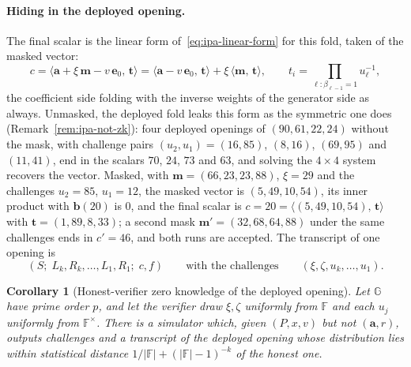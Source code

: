 \documentclass[11pt,a4paper]{article}
\newtheorem{corollary}[theorem]{Corollary}
\theoremstyle{definition}
\newcommand{\F}{\mathbb{F}}
\newcommand{\G}{\mathbb{G}}
\newcommand{\ip}[2]{\langle #1,\, #2 \rangle}
\begin{document}
\paragraph{Hiding in the deployed opening.}
The final scalar is the linear form of~\eqref{eq:ipa-linear-form} for
this fold, taken of the masked vector:
\begin{equation}\label{eq:ipa-masked-scalar}
c = \ip{\mathbf a + \xi\,\mathbf m - v\,\mathbf e_0}{\mathbf t}
  = \ip{\mathbf a - v\,\mathbf e_0}{\mathbf t} + \xi\,\ip{\mathbf m}{\mathbf t},
\qquad
t_i = \prod_{\ell : \beta_{\ell-1} = 1} u_\ell^{-1},
\end{equation}
the coefficient side folding with the inverse weights of the generator
side as always. Unmasked, the deployed fold leaks this form as the
symmetric one does (Remark~\ref{rem:ipa-not-zk}):
four deployed openings of $(90, 61, 22, 24)$ without the mask, with
challenge pairs $(u_2, u_1) = (16, 85)$, $(8, 16)$, $(69, 95)$ and
$(11, 41)$, end in the scalars $70$, $24$, $73$ and $63$, and solving
the $4 \times 4$ system recovers the vector.
Masked, with $\mathbf m = (66, 23, 23, 88)$, $\xi = 29$ and the
challenges $u_2 = 85$, $u_1 = 12$, the masked vector is
$(5, 49, 10, 54)$, its inner product with $\mathbf b(20)$ is $0$, and
the final scalar is $c = 20 = \ip{(5, 49, 10, 54)}{\mathbf t}$ with
$\mathbf t = (1, 89, 8, 33)$; a second mask
$\mathbf m' = (32, 68, 64, 88)$ under the same challenges ends in
$c' = 46$, and both runs are accepted. The transcript of one opening
is
\[
(S;\; L_k, R_k, \dots, L_1, R_1;\; c, f)
\qquad\text{with the challenges}\qquad
(\xi, \zeta, u_k, \dots, u_1).
\]

\begin{corollary}[Honest-verifier zero knowledge of the deployed
  opening]\label{cor:ipa-hvzk-dep}
Let $\G$ have prime order $p$, and let the verifier draw $\xi, \zeta$
uniformly from $\F$ and each $u_j$ uniformly from $\F^{\times}$. There
is a simulator which, given $(P, x, v)$ but not $(\mathbf a, r)$,
outputs challenges and a transcript of the deployed opening whose
distribution lies within statistical distance
$1/|\F| + (|\F| - 1)^{-k}$ of the honest one.
\end{corollary}
\end{document}
